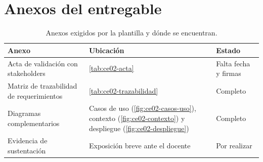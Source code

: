 




\section{Anexos del entregable}
\label{sec:ce02-e1-anexos}

\begin{table}[H]
\centering
\caption{Anexos exigidos por la plantilla y dónde se encuentran.}
\label{tab:ce02-e1-anexos}
\small
\begin{tabularx}{\textwidth}{L{5cm}XL{2.2cm}}
\toprule
\textbf{Anexo} & \textbf{Ubicación} & \textbf{Estado} \\
\midrule
Acta de validación con stakeholders & \cref{tab:ce02-acta} & Falta fecha y firmas \\
Matriz de trazabilidad de requerimientos & \cref{tab:ce02-trazabilidad} & Completo \\
Diagramas complementarios & Casos de uso (\cref{fig:ce02-casos-uso}), contexto (\cref{fig:ce02-contexto}) y despliegue (\cref{fig:ce02-despliegue}) & Completo \\
Evidencia de sustentación & Exposición breve ante el docente & Por realizar \\
\bottomrule
\end{tabularx}
\end{table}

